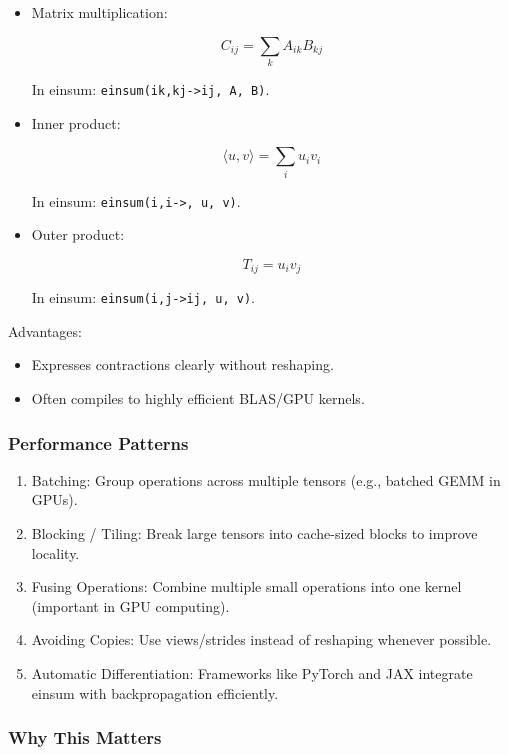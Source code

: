 \documentclass[
  letterpaper,
  DIV=11,
  numbers=noendperiod]{scrreprt}
\providecommand{\tightlist}{%
  \setlength{\itemsep}{0pt}\setlength{\parskip}{0pt}}
\begin{document}
\begin{itemize}
\item
  Matrix multiplication:

  \[
  C_{ij} = \sum_k A_{ik} B_{kj}
  \]

  In einsum:
  \texttt{einsum(\textquotesingle{}ik,kj-\textgreater{}ij\textquotesingle{},\ A,\ B)}.
\item
  Inner product:

  \[
  \langle u,v \rangle = \sum_i u_i v_i
  \]

  In einsum:
  \texttt{einsum(\textquotesingle{}i,i-\textgreater{}\textquotesingle{},\ u,\ v)}.
\item
  Outer product:

  \[
  T_{ij} = u_i v_j
  \]

  In einsum:
  \texttt{einsum(\textquotesingle{}i,j-\textgreater{}ij\textquotesingle{},\ u,\ v)}.
\end{itemize}

Advantages:

\begin{itemize}
\tightlist
\item
  Expresses contractions clearly without reshaping.
\item
  Often compiles to highly efficient BLAS/GPU kernels.
\end{itemize}

\subsubsection{Performance Patterns}\label{performance-patterns}

\begin{enumerate}
\def\labelenumi{\arabic{enumi}.}
\item
  Batching: Group operations across multiple tensors (e.g., batched GEMM
  in GPUs).
\item
  Blocking / Tiling: Break large tensors into cache-sized blocks to
  improve locality.
\item
  Fusing Operations: Combine multiple small operations into one kernel
  (important in GPU computing).
\item
  Avoiding Copies: Use views/strides instead of reshaping whenever
  possible.
\item
  Automatic Differentiation: Frameworks like PyTorch and JAX integrate
  einsum with backpropagation efficiently.
\end{enumerate}

\subsubsection{Why This Matters}\label{why-this-matters-40}
\end{document}
